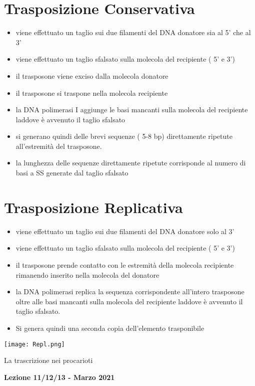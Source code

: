 \documentclass{article}
\begin{document}
\section{Trasposizione Conservativa}
\begin{itemize}
    \item viene effettuato un taglio sui due filamenti del DNA donatore sia al 5'
    che al 3'
    \item viene effettuato un taglio sfalsato sulla molecola del recipiente ( 5' e
    3')
    \item il trasposone viene exciso dalla molecola donatore
    \item il trasposone si traspone nella molecola recipiente
    \item la DNA polimerasi I aggiunge le basi mancanti sulla molecola del
    recipiente laddove è avvenuto il taglio sfalsato
    \item si generano quindi delle brevi sequenze ( 5-8 bp) direttamente
    ripetute all'estremità del trasposone.
    \item la lunghezza delle sequenze direttamente ripetute corrisponde al
    numero di basi a SS generate dal taglio sfalsato
\end{itemize}
\section{Trasposizione Replicativa}
\begin{itemize}
    \item viene effettuato un taglio sui due filamenti del DNA donatore solo al 3'
    \item viene effettuato un taglio sfalsato sulla molecola del recipiente ( 5' e 3')
    \item il trasposone prende contatto con le estremità della molecola recipiente
    rimanendo inserito nella molecola del donatore
    \item la DNA polimerasi replica la sequenza corrispondente all'intero trasposone
    oltre alle basi mancanti sulla molecola del recipiente laddove è avvenuto il
    taglio sfalsato.
    \item Si genera quindi una seconda copia dell'elemento trasponibile
\end{itemize}
\begin{center}
    \texttt{[image: Repl.png]}
\end{center}


\begin{titlepage}
    \begin{center}
        \vspace*{1cm}
        \huge
        La trascrizione nei procarioti
            
        \vspace{1.5cm}
        
        \Large
        \textbf{Lezione 11/12/13 - Marzo 2021}

        \vspace{0.8cm}

    \end{center}
\end{titlepage}
\setcounter{page}{48}
\end{document}
